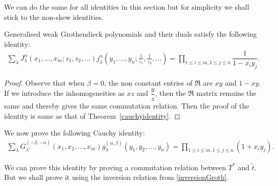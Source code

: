 \documentclass[ALCO, Unicode]{cedram}
\begin{document}
We can do the same for all identities in this section but for simplicity we shall stick to the non-skew identities.

\begin{coro}
Generalised weak Grothendieck polynomials and their duals satisfy the following identity:
\begin{align}
\sum_{\lambda} J^{\alpha}_{\lambda}(x_1,\dots,x_m;z_1,z_2,\dots) j^{\alpha}_{\lambda} (y_1,\dots,y_n;\frac{1}{z_1},\frac{1}{z_2},\dots)= \prod_{1\le i \le m,1\le j\leq n} \dfrac{1}{1-x_iy_j}.
\end{align}
\end{coro}
\begin{proof}
Observe that when $\beta=0$, the non constant entries of $\mathfrak{R}$ are $xy$ and $1-xy$. If we introduce the inhomogeneities as $xz$ and $\dfrac{y}{z}$, then the $\mathfrak{R}$ matrix remains the same and thereby gives the same commutation relation. 
Then the proof of the identity is same as that of Theorem~\ref{cauchyidentity}.
\end{proof}


We now prove the following Cauchy identity:
\begin{align}
\label{involcauchyeq}
    \sum_{\lambda}G^{(-\beta,-\alpha)}_{\lambda'}(x_1,x_2,\dots,x_m) g^{(\alpha,\beta)}_{\lambda}(y_1,y_2,\dots,y_n)=\prod_{1\le i \le m,1\le j\le n} {(1+x_i y_j)}.
\end{align}

We can prove this identity by proving a commutation relation between $T^*$ and $\tilde{t}$. 
But we shall prove it using the inversion relation from \eqref{inversionGroth}.
\end{document}

